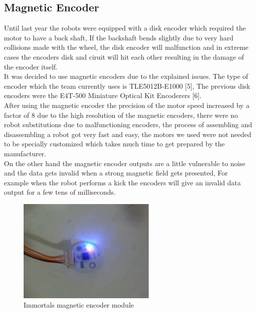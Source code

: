\subsection{Magnetic Encoder}
Until last year the robots were equipped with a disk encoder which required the motor to have a back shaft, If the backshaft bends slightly due to very hard collisions made with the wheel, the disk encoder will malfunction and in extreme cases the encoders disk and ciruit will hit each other resulting in the damage of the encoder itself.\\
\indent It was decided to use magnetic encoders due to the explained issues. The type of encoder which the team currently uses is TLE5012B-E1000 [5], The previous disk encoders were the E4T-500 Miniature Optical Kit Encoderers [6].\\
\indent After using the magnetic encoder the precision of the motor speed increased by a factor of 8 due to the high resolution of the magnetic encoders, there were no robot substitutions due to malfunctioning encoders, the process of assembling and disassembling a robot got very fast and easy, the motors we used were not needed to be specially customized which takes much time to get prepared by the manufacturer.\\
\indent On the other hand the magnetic encoder outputs are a little vulnerable to noise and the data gets invalid when a strong magnetic field gets presented, For example when the robot performs a kick the encoders will give an invalid data output for a few tens of milliseconds.\\




\begin{figure}
	\centering
	\includegraphics[width=0.6\textwidth]{images/MAG_ENC.jpg}
	\caption{Immortals magnetic encoder module}
	\label{fig:MAG_ENC}
\end{figure}\\


